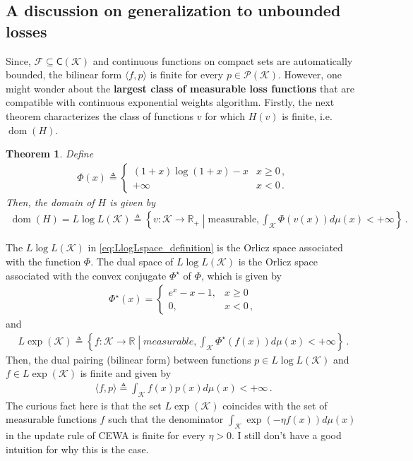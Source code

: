 \documentclass{article}
\theoremstyle{plain}
\newtheorem{theorem}{Theorem}
\theoremstyle{definition}
\theoremstyle{plain}
\newcommand{\dom}[1]{\operatorname{dom}(#1)}
\newcommand{\R}{\mathbb R}
\newcommand{\K}{\mathcal K}
\newcommand{\cF}{\mathcal F}
\newcommand{\cP}{\mathcal P}
\newcommand{\cewaalg}{\textsf{CEWA}\xspace}
\begin{document}
\subsection{A discussion on generalization to unbounded losses}
Since, $\cF \subseteq \mathsf{C}(\K)$ and continuous functions on compact sets are automatically bounded, the bilinear form $\langle f, p \rangle$ is finite for every $p \in \cP(\K)$.
However, one might wonder about the \textbf{largest class of measurable loss functions} that are compatible with continuous exponential weights algorithm.
Firstly, the next theorem characterizes the class of functions $v$ for which $H(v)$ is finite, i.e. $\dom{H}$.
\begin{theorem}
    \label{thm:negentropy-LlogLspace}
    Define
    \begin{align}
        \Phi(x) \triangleq \begin{cases}
                               (1+x) \log(1+x) - x & x \ge 0\,, \\
                               +\infty             & x < 0\,.
                           \end{cases}
    \end{align}
    Then, the domain of $H$ is given by
    \begin{align}
        \dom{H} = L\log\!L(\K) \triangleq \left\{v: \K \to \R_+ \middle| \text{measurable}, \int_\K \Phi(v(x))d\mu(x) < +\infty\right\}\,. \label{eq:LlogLspace_definition}
    \end{align}
\end{theorem}
The $L\log\!L(\K)$ in \cref{eq:LlogLspace_definition} is the Orlicz space associated with the function $\Phi$.
The dual space of $L\log\!L(\K)$ is the Orlicz space associated with the convex conjugate $\Phi^\star$ of $\Phi$, which is given by
\begin{align}
    \Phi^\star(x) = \begin{cases}
                        e^x - x - 1, & x \ge 0  \\
                        0,           & x < 0\,,
                    \end{cases}
\end{align}
and
\begin{align}
    L\!\exp(\K) \triangleq \left\{f: \K \to \R \middle| \textit{measurable}, \int_\K \Phi^\star(f(x)) d\mu(x) < +\infty\right\}\,.
\end{align}
Then, the dual pairing (bilinear form) between functions $p \in L\!\log\!L(\K)$ and $f \in L\!\exp(\K)$ is finite and given by
\begin{align}
    \langle f, p \rangle \triangleq \int_\K f(x) p(x) d\mu(x) < +\infty\,.
\end{align}
The curious fact here is that the set $L\!\exp(\K)$ coincides with the set of measurable functions $f$ such that the denominator $\int_\K \exp(-\eta f(x)) d\mu(x)$ in the update rule of \cewaalg is finite for every $\eta > 0$.
I still don't have a good intuition for why this is the case.
\end{document}
